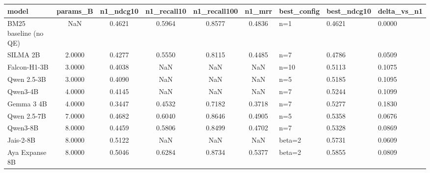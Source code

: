 \begin{tabular}{lccccc}
\toprule
model & params_B & n1_ndcg10 & n1_recall10 & n1_recall100 & n1_mrr & best_config & best_ndcg10 & delta_vs_n1 \\
\midrule
BM25 baseline (no QE) & NaN & 0.4621 & 0.5964 & 0.8577 & 0.4836 & n=1 & 0.4621 & 0.0000 \\
SILMA 2B & 2.0000 & 0.4277 & 0.5550 & 0.8115 & 0.4485 & n=7 & 0.4786 & 0.0509 \\
Falcon-H1-3B & 3.0000 & 0.4038 & NaN & NaN & NaN & n=10 & 0.5113 & 0.1075 \\
Qwen 2.5-3B & 3.0000 & 0.4090 & NaN & NaN & NaN & n=5 & 0.5185 & 0.1095 \\
Qwen3-4B & 4.0000 & 0.4145 & NaN & NaN & NaN & n=7 & 0.5244 & 0.1099 \\
Gemma 3 4B & 4.0000 & 0.3447 & 0.4532 & 0.7182 & 0.3718 & n=7 & 0.5277 & 0.1830 \\
Qwen 2.5-7B & 7.0000 & 0.4682 & 0.6040 & 0.8646 & 0.4905 & n=5 & 0.5358 & 0.0676 \\
Qwen3-8B & 8.0000 & 0.4459 & 0.5806 & 0.8499 & 0.4702 & n=7 & 0.5328 & 0.0869 \\
Jais-2-8B & 8.0000 & 0.5122 & NaN & NaN & NaN & beta=2 & 0.5731 & 0.0609 \\
Aya Expanse 8B & 8.0000 & 0.5046 & 0.6284 & 0.8734 & 0.5377 & beta=2 & 0.5855 & 0.0809 \\
\bottomrule
\end{tabular}
